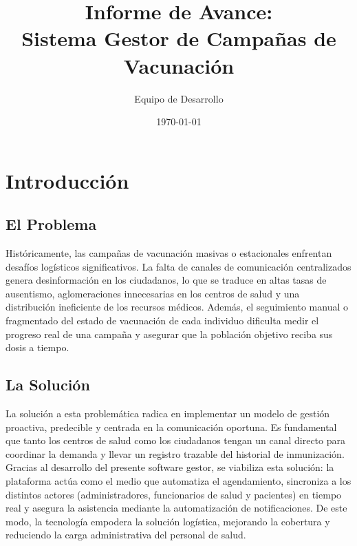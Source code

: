 \documentclass[12pt,a4paper]{article}
\title{\textbf{Informe de Avance: \\ Sistema Gestor de Campañas de Vacunación}}
\author{Equipo de Desarrollo}
\date{\today}
\begin{document}
\maketitle

\section{Introducción}
\subsection{El Problema}
Históricamente, las campañas de vacunación masivas o estacionales enfrentan desafíos logísticos significativos. La falta de canales de comunicación centralizados genera desinformación en los ciudadanos, lo que se traduce en altas tasas de ausentismo, aglomeraciones innecesarias en los centros de salud y una distribución ineficiente de los recursos médicos. Además, el seguimiento manual o fragmentado del estado de vacunación de cada individuo dificulta medir el progreso real de una campaña y asegurar que la población objetivo reciba sus dosis a tiempo.

\subsection{La Solución}
La solución a esta problemática radica en implementar un modelo de gestión proactiva, predecible y centrada en la comunicación oportuna. Es fundamental que tanto los centros de salud como los ciudadanos tengan un canal directo para coordinar la demanda y llevar un registro trazable del historial de inmunización. Gracias al desarrollo del presente software gestor, se viabiliza esta solución: la plataforma actúa como el medio que automatiza el agendamiento, sincroniza a los distintos actores (administradores, funcionarios de salud y pacientes) en tiempo real y asegura la asistencia mediante la automatización de notificaciones. De este modo, la tecnología empodera la solución logística, mejorando la cobertura y reduciendo la carga administrativa del personal de salud.
\end{document}

